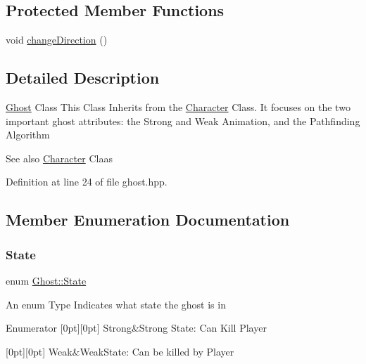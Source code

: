 \subsection*{Protected Member Functions}
\begin{DoxyCompactItemize}
\item 
void \hyperlink{class_ghost_a08831fa01afa61f91365ce82cf33bf1b}{change\+Direction} ()
\end{DoxyCompactItemize}


\subsection{Detailed Description}
\hyperlink{class_ghost}{Ghost} Class This Class Inherits from the \hyperlink{class_character}{Character} Class. It focuses on the two important ghost attributes\+: the Strong and Weak Animation, and the Pathfinding Algorithm \begin{DoxySeeAlso}{See also}
\hyperlink{class_character}{Character} Claas 
\end{DoxySeeAlso}


Definition at line 24 of file ghost.\+hpp.



\subsection{Member Enumeration Documentation}
\mbox{\label{class_ghost_af712fc09f900832a0225928c4556234d}} 
\subsubsection{\texorpdfstring{State}{State}}
{\footnotesize\ttfamily enum \hyperlink{class_ghost_af712fc09f900832a0225928c4556234d}{Ghost\+::\+State}}

An enum Type Indicates what state the ghost is in \begin{DoxyEnumFields}{Enumerator}
[0pt][0pt]{}\mbox{\label{class_ghost_af712fc09f900832a0225928c4556234dacfaab1cebc10dc849b5e740dad4eb7f0}} 
Strong&Strong State\+: Can Kill Player \\
\hline

[0pt][0pt]{}\mbox{\label{class_ghost_af712fc09f900832a0225928c4556234da2728b733f9f5d557a05e6fa1aaaf174a}} 
Weak&Weak\+State\+: Can be killed by Player \\
\hline

\end{DoxyEnumFields}


